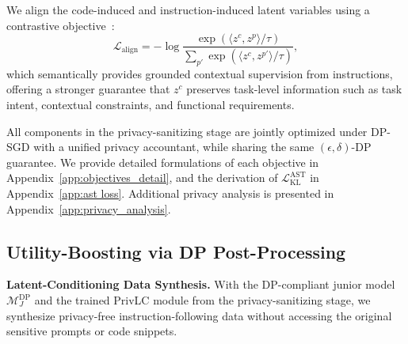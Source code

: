 \documentclass{article}
\theoremstyle{plain}
\theoremstyle{definition}
\theoremstyle{remark}
\begin{document}
We align the code-induced and instruction-induced latent variables using a contrastive objective~\cite{oord2018representation}:
\begin{equation}
\mathcal{L}_{\text{align}} = - \log 
\frac{\exp(\langle z^c, z^p \rangle / \tau)}
{\sum_{p'} \exp(\langle z^c, z^{p'} \rangle / \tau)},
\end{equation}
which semantically provides grounded contextual supervision from instructions, offering a stronger guarantee that $z^c$ preserves task-level information such as task intent, contextual constraints, and functional requirements.





All components in the privacy-sanitizing stage
are jointly optimized under DP-SGD with a unified privacy accountant, while sharing the same $(\epsilon,\delta)$-DP guarantee.  %
We provide detailed formulations of each objective in Appendix~\ref{app:objectives_detail}, and the derivation of $\mathcal{L}_{\text{KL}}^{\text{AST}}$ in Appendix~\ref{app:ast loss}. Additional privacy analysis is presented in Appendix~\ref{app:privacy_analysis}.




\subsection{Utility-Boosting via DP Post-Processing}
\label{sec:stage2}

\noindent\textbf{Latent-Conditioning Data Synthesis.}
With the DP-compliant junior model $\mathcal{M}_J^{\text{DP}}$ and the trained PrivLC module from the privacy-sanitizing stage, we synthesize privacy-free instruction-following data without accessing the original sensitive prompts or code snippets. 
\end{document}
